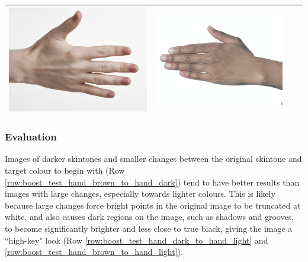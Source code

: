 \documentclass[12pt, a4paper]{article}
\begin{document}
\begin{longtable}{|c||c|c|c|}
\begin{minipage}{.29\textwidth}
    \includegraphics[width=\textwidth,height=\textheight,keepaspectratio]{../inputs/hand_pale.jpg}
  \end{minipage} & 
  \begin{minipage}{.29\textwidth}
    \includegraphics[width=\textwidth,height=\textheight,keepaspectratio]{../rc_test/outputs/20170516_boost_test/hand_brown_to_hand_pale.jpg}
  \end{minipage} \\
    \hline
\end{longtable}

\subsubsection{Evaluation}
Images of darker skintones and smaller changes between the original skintone and target colour to begin with (Row \ref{row:boost_test_hand_brown_to_hand_dark}) tend to have better results than images with large changes, especially towards lighter colours. This is likely because large changes force bright points in the original image to be truncated at white, and also causes dark regions on the image, such as shadows and grooves, to become significantly brighter and less close to true black, giving the image a ``high-key" look (Row \ref{row:boost_test_hand_dark_to_hand_light} and \ref{row:boost_test_hand_brown_to_hand_light}).
\end{document}
